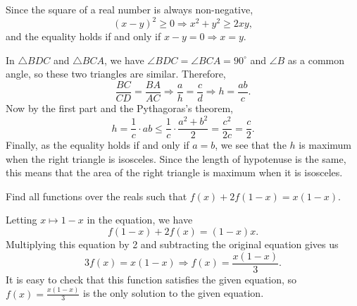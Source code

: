 \begin{solution}
    Since the square of a real number is always non-negative,
    \[ (x - y)^2 \geq 0 \Longrightarrow x^2 + y^2 \geq 2xy, \]
    and the equality holds if and only if $x - y = 0 \Rightarrow x = y$.

    In $\triangle BDC$ and $\triangle BCA$, we have $\angle BDC = \angle BCA =
    90^\circ$ and $\angle B$ as a common angle, so these two triangles are
    similar. Therefore, 
    \[ \frac{BC}{CD} = \frac{BA}{AC} \Longrightarrow \frac{a}{h} = \frac{c}{d}
    \Longrightarrow h = \frac{ab}{c}. \]
    Now by the first part and the Pythagoras's theorem,
    \[ h = \frac{1}{c} \cdot ab \leq \frac{1}{c} \cdot \frac{a^2 + b^2}{2} =
    \frac{c^2}{2c} = \frac{c}{2}. \]
    Finally, as the equality holds if and only if $a = b$, we see that the $h$
    is maximum when the right triangle is isosceles. Since the length of
    hypotenuse is the same, this means that the area of the right triangle is
    maximum when it is isosceles.
\end{solution}

\begin{question}
    Find all functions over the reals such that $f(x) + 2f(1 - x) = x(1 - x)$.
\end{question}
\begin{solution}
    Letting $x \mapsto 1 - x$ in the equation, we have
    \[ f(1 - x) + 2f(x) = (1 - x)x. \]
    Multiplying this equation by 2 and subtracting the original equation gives
    us
    \[ 3f(x) = x(1 - x) \Longrightarrow f(x) = \frac{x(1 - x)}{3}. \]
    It is easy to check that this function satisfies the given equation, so
    $f(x) = \frac{x(1 - x)}{3}$ is the only solution to the given equation.
\end{solution}

